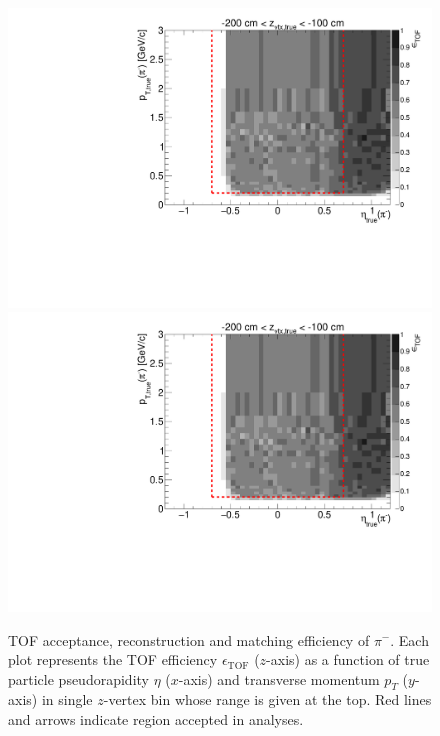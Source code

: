 \begin{figure}[hb]
\caption[TOF acceptance, reconstruction and matching efficiency of $\pi^{-}$.]{TOF acceptance, reconstruction and matching efficiency of $\pi^{-}$. Each plot represents the TOF efficiency $\epsilon_{\text{TOF}}$ ($z$-axis) as a function of true particle pseudorapidity $\eta$ ($x$-axis) and transverse momentum $p_{T}$ ($y$-axis) in single $z$-vertex bin whose range is given at the top. Red lines and arrows indicate region accepted in analyses.}\label{fig:tofEff_pion_minus}
\centering
\parbox{0.495\textwidth}{
  \centering
  \includegraphics[width=\linewidth,page=3]{graphics/eff/Eff2D_TOF_pion_Minus.pdf}\\
  \includegraphics[width=\linewidth,page=5]{graphics/eff/Eff2D_TOF_pion_Minus.pdf}\\
}
\end{figure}
